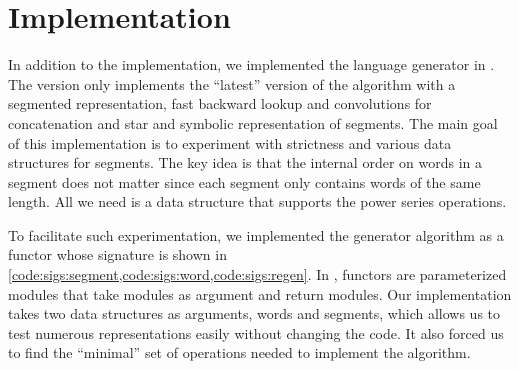 \section{\ocaml Implementation}
\label{sec:ocaml}

\lstset{language=[Objective]Caml}

In addition to the \haskell implementation, we implemented the language generator
in \ocaml.
The \ocaml version only implements the ``latest'' version of the
algorithm with a segmented representation, fast backward lookup and convolutions
for concatenation and star and symbolic representation of segments.
The main goal of this implementation is to experiment with strictness
and various data structures for segments. 
The key idea is that the internal order on words in a segment does not matter
since each segment only contains words of the same length.
All we need is a data structure that supports the power series
operations.

To facilitate such experimentation, we implemented the generator
algorithm as a functor whose signature is shown in
\cref{code:sigs:segment,code:sigs:word,code:sigs:regen}.
In \ocaml, functors are parameterized modules that take modules
as argument and return modules. Our implementation
takes two data structures as arguments, words and segments,
which allows us to test numerous representations easily without changing
the code. It also forced us to find the ``minimal'' set of operations
needed to implement the algorithm.

